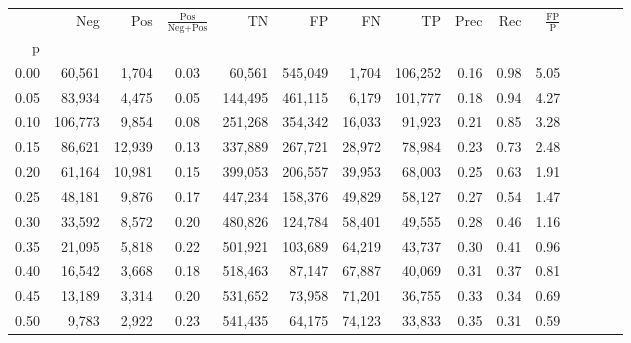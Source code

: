 \begin{tabular}{rrrcrrrrrrrrrrr}
\toprule
{} &      Neg &     Pos & $\frac{\text{Pos}}{\text{Neg}+\text{Pos}}$ &       TN &       FP &       FN &       TP &  Prec &   Rec & $\frac{\text{FP}}{\text{P}}$ \\
p    &          &         &                                            &          &          &          &          &       &       &                              \\
\midrule
0.00 &   60,561 &   1,704 &                                       0.03 &   60,561 &  545,049 &    1,704 &  106,252 &  0.16 &  0.98 &                         5.05 \\
0.05 &   83,934 &   4,475 &                                       0.05 &  144,495 &  461,115 &    6,179 &  101,777 &  0.18 &  0.94 &                         4.27 \\
0.10 &  106,773 &   9,854 &                                       0.08 &  251,268 &  354,342 &   16,033 &   91,923 &  0.21 &  0.85 &                         3.28 \\
0.15 &   86,621 &  12,939 &                                       0.13 &  337,889 &  267,721 &   28,972 &   78,984 &  0.23 &  0.73 &                         2.48 \\
0.20 &   61,164 &  10,981 &                                       0.15 &  399,053 &  206,557 &   39,953 &   68,003 &  0.25 &  0.63 &                         1.91 \\
0.25 &   48,181 &   9,876 &                                       0.17 &  447,234 &  158,376 &   49,829 &   58,127 &  0.27 &  0.54 &                         1.47 \\
0.30 &   33,592 &   8,572 &                                       0.20 &  480,826 &  124,784 &   58,401 &   49,555 &  0.28 &  0.46 &                         1.16 \\
0.35 &   21,095 &   5,818 &                                       0.22 &  501,921 &  103,689 &   64,219 &   43,737 &  0.30 &  0.41 &                         0.96 \\
0.40 &   16,542 &   3,668 &                                       0.18 &  518,463 &   87,147 &   67,887 &   40,069 &  0.31 &  0.37 &                         0.81 \\
0.45 &   13,189 &   3,314 &                                       0.20 &  531,652 &   73,958 &   71,201 &   36,755 &  0.33 &  0.34 &                         0.69 \\
0.50 &    9,783 &   2,922 &                                       0.23 &  541,435 &   64,175 &   74,123 &   33,833 &  0.35 &  0.31 &                         0.59 \\

\end{tabular}
